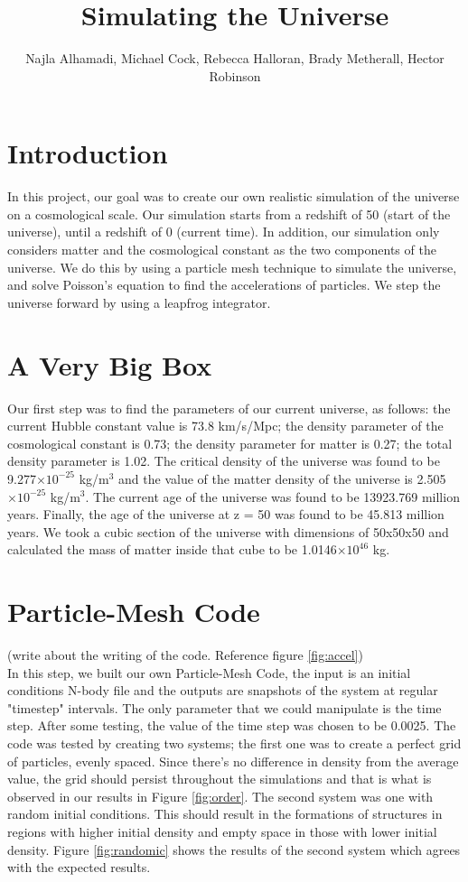\documentclass[10pt]{article}
\title{Simulating the Universe}
\author{Najla Alhamadi, Michael Cock, Rebecca Halloran, Brady Metherall, Hector Robinson}
\providecommand{\e}[1]{\ensuremath{\times 10^{#1}}}
\begin{document}
\maketitle
\section{Introduction}
	In this project, our goal was to create our own realistic simulation of the universe on a cosmological scale. Our simulation starts from a redshift of 50 (start of the universe), until a redshift of 0 (current time). In addition, our simulation only considers matter and the cosmological constant as the two components of the universe. We do this by using a particle mesh technique to simulate the universe, and solve Poisson's equation to find the accelerations of particles. We step the universe forward by using a leapfrog integrator.
\section{A Very Big Box}
	Our first step was to find the parameters of our current universe, as follows: the current Hubble constant value is 73.8 km/s/Mpc; the density parameter of the cosmological constant is 0.73; the density parameter for matter is 0.27; the total density parameter is 1.02. The critical density of the universe was found to be 9.277\e{-25} kg/m$^3$ and the value of the matter density of the universe is 2.505\e{-25} kg/m$^3$. The current age of the universe was found to be 13923.769 million years. Finally, the age of the universe at z = 50 was found to be 45.813 million years. We took a cubic section of the universe with dimensions of 50x50x50 and calculated the mass of matter inside that cube to be 1.0146\e{46} kg.  
\section{Particle-Mesh Code}
 (write about the writing of the code. Reference figure \ref{fig:accel}) \\
	In this step, we built our own Particle-Mesh Code, the input is an initial conditions N-body file and the outputs are snapshots of the system at regular "timestep" intervals. The only parameter that we could manipulate is the time step. After some testing, the value of the time step was chosen to be 0.0025. The code was tested by creating two systems; the first one was to create a perfect grid of particles, evenly spaced. Since there’s no difference in density from the average value, the grid should persist throughout the simulations and that is what is observed in our results in Figure \ref{fig:order}{}. The second system was one with random initial conditions. This should result in the formations of structures in regions with higher initial density and empty space in those with lower initial density. Figure \ref{fig:randomic}{} shows the results of the second system which agrees with the expected results.       
\end{document}
